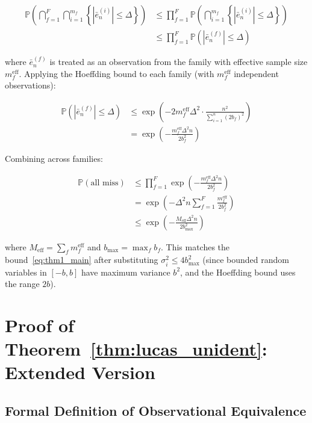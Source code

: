\documentclass[12pt,a4paper]{article}
\begin{document}
\begin{align}
    \mathbb{P}\left(\bigcap_{f=1}^{F} \bigcap_{i=1}^{m_f}
    \left\{|\bar{e}_n^{(i)}| \leq \Delta\right\}\right)
    &\leq \prod_{f=1}^{F} \mathbb{P}\left(\bigcap_{i=1}^{m_f}
       \left\{|\bar{e}_n^{(i)}| \leq \Delta\right\}\right) \nonumber \\
    &\leq \prod_{f=1}^{F} \mathbb{P}\left(
       |\bar{e}_n^{(f)}| \leq \Delta\right) \label{eq:union_cross_family}
\end{align}

where $\bar{e}_n^{(f)}$ is treated as an observation from the family
with effective sample size $m_f^{\text{eff}}$.  Applying the Hoeffding
bound to each family (with $m_f^{\text{eff}}$ independent observations):

\begin{align}
    \mathbb{P}\left(|\bar{e}_n^{(f)}| \leq \Delta\right)
    &\leq \exp\left(-2 m_f^{\text{eff}} \Delta^2 \cdot
       \frac{n^2}{\sum_{i=1}^n (2b_f)^2}\right) \nonumber \\
    &= \exp\left(-\frac{m_f^{\text{eff}} \Delta^2 n}{2b_f^2}\right)
       \label{eq:family_bound}
\end{align}

Combining across families:

\begin{align}
    \mathbb{P}(\text{all miss}) &\leq
    \prod_{f=1}^{F} \exp\left(-\frac{m_f^{\text{eff}} \Delta^2 n}
    {2b_f^2}\right) \nonumber \\
    &= \exp\left(-\Delta^2 n \sum_{f=1}^{F}
       \frac{m_f^{\text{eff}}}{2b_f^2}\right) \nonumber \\
    &\leq \exp\left(-\frac{M_{\text{eff}} \Delta^2 n}{2b_{\max}^2}
       \right) \label{eq:final_bound_detailed}
\end{align}

where $M_{\text{eff}} = \sum_f m_f^{\text{eff}}$ and
$b_{\max} = \max_f b_f$.  This matches the bound~\eqref{eq:thm1_main}
after substituting $\sigma_i^2 \leq 4b_{\max}^2$ (since bounded random
variables in $[-b, b]$ have maximum variance $b^2$, and the Hoeffding
bound uses the range $2b$).

\section{Proof of Theorem~\ref{thm:lucas_unident}: Extended Version}
\label{app:thm2_extended}

\subsection{Formal Definition of Observational Equivalence}
\end{document}
